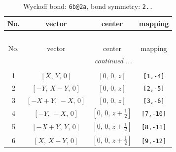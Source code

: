 \documentclass[fleqn,8pt]{jsarticle}
\begin{document}
\begin{longtable}{cccc}
\caption{Wyckoff bond: {\tt 6b@2a}, bond symmetry: {\tt 2..}}
 \\
 \hline \hline
No. & vector & center & mapping \\ \hline \endfirsthead

\multicolumn{3}{l}{\tablename\ \thetable{}} \\
 \hline \hline
No. & vector & center & mapping \\ \hline \endhead

 \hline \hline
\multicolumn{3}{r}{\footnotesize\it continued ...} \\ \endfoot

 \hline \hline
\multicolumn{3}{r}{} \\ \endlastfoot

1 & $\left[ X,\, Y,\, 0 \right]$ & $\left[ 0,\, 0,\, z \right]$ & {\tt [1,-4]} \\ \hline
2 & $\left[ - Y,\, X - Y,\, 0 \right]$ & $\left[ 0,\, 0,\, z \right]$ & {\tt [2,-5]} \\ \hline
3 & $\left[ - X + Y,\, - X,\, 0 \right]$ & $\left[ 0,\, 0,\, z \right]$ & {\tt [3,-6]} \\ \hline
4 & $\left[ - Y,\, - X,\, 0 \right]$ & $\left[ 0,\, 0,\, z + \frac{1}{2} \right]$ & {\tt [7,-10]} \\ \hline
5 & $\left[ - X + Y,\, Y,\, 0 \right]$ & $\left[ 0,\, 0,\, z + \frac{1}{2} \right]$ & {\tt [8,-11]} \\ \hline
6 & $\left[ X,\, X - Y,\, 0 \right]$ & $\left[ 0,\, 0,\, z + \frac{1}{2} \right]$ & {\tt [9,-12]} \\
\end{longtable}
\renewcommand{\arraystretch}{1.2}
\end{document}
